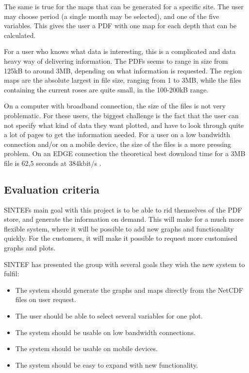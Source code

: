 \documentclass[11pt,a4paper,titlepage,oneside]{report}
\begin{document}
The same is true for the maps that can be generated for a specific site. The user may choose period (a single month may be selected), and one of the five variables. This gives the user a PDF with one map for each depth that can be calculated. 

For a user who knows what data is interesting, this is a complicated and data heavy way of delivering information. The PDFs seems to range in size from 125kB to around 3MB, depending on what information is requested. The region maps are the absolute largest in file size, ranging from 1 to 3MB, while the files containing the current roses are quite small, in the 100-200kB range. 

On a computer with broadband connection, the size of the files is not very problematic. For these users, the biggest challenge is the fact that the user can not specify what kind of data they want plotted, and have to look through quite a lot of pages to get the information needed. For a user on a low bandwidth connection and/or on a mobile device, the size of the files is a more pressing problem. On an EDGE connection the theoretical best download time for a 3MB file is 62,5 seconds at 384kbit/s \cite{3gpp.com}.

\subsection{Evaluation criteria}
SINTEFs main goal with this project is to be able to rid themselves of the PDF store, and generate the information on demand. This will make for a much more flexible system, where it will be possible to add new graphs and functionality quickly. For the customers, it will make it possible to request more customised graphs and plots.

SINTEF has presented the group with several goals they wish the new system to fulfil:

\begin{itemize}
\item The system should generate the graphs and maps directly from the NetCDF files on user request.
\item The user should be able to select several variables for one plot.
\item The system should be usable on low bandwidth connections.
\item The system should be usable on mobile devices.
\item The system should be easy to expand with new functionality.
\end{itemize} 
\end{document}
